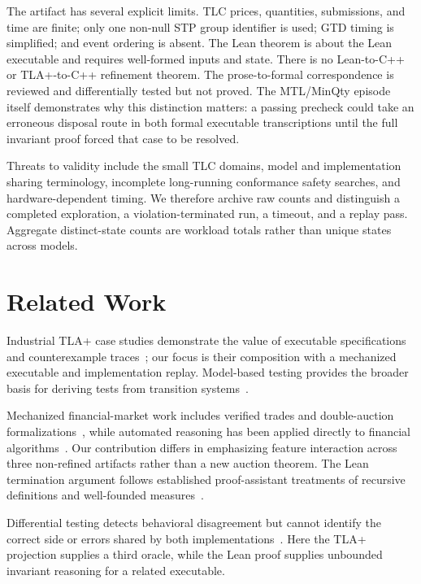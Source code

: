 \documentclass[runningheads]{llncs}
\begin{document}
The artifact has several explicit limits. TLC prices, quantities, submissions,
and time are finite; only one non-null STP group identifier is used; GTD timing
is simplified; and event ordering is absent. The Lean theorem is about the
Lean executable and requires well-formed inputs and state. There is no
Lean-to-C++ or TLA+-to-C++ refinement theorem.
The prose-to-formal correspondence is reviewed and differentially tested but
not proved. The MTL/MinQty episode itself demonstrates why this distinction
matters: a passing precheck could take an erroneous disposal route in both
formal executable transcriptions until the full invariant proof forced that
case to be resolved.

Threats to validity include the small TLC domains, model and implementation
sharing terminology, incomplete long-running conformance safety searches, and
hardware-dependent timing. We therefore archive raw counts and distinguish a
completed exploration, a violation-terminated run, a timeout, and a replay
pass. Aggregate distinct-state counts are workload totals rather than unique
states across models.

\section{Related Work}

Industrial TLA+ case studies demonstrate the value of executable
specifications and counterexample traces~\cite{Newcombe2015,Newcombe2014}; our
focus is their composition with a mechanized executable and implementation
replay. Model-based testing provides the broader basis for deriving tests from
transition systems~\cite{Tretmans2008,Utting2012}.

Mechanized financial-market work includes verified trades and double-auction
formalizations~\cite{Sarswat2020,Natarajan2021,Garg2025}, while automated
reasoning has been applied directly to financial
algorithms~\cite{Passmore2017,Passmore2021}.
Our contribution differs in emphasizing feature interaction across three
non-refined artifacts rather than a new auction theorem. The Lean termination
argument follows established proof-assistant treatments of recursive
definitions and well-founded measures~\cite{Krauss2009,Bove2016}.

Differential testing detects behavioral disagreement but cannot identify the
correct side or errors shared by both implementations~\cite{McKeeman1998}.
Here the TLA+ projection supplies a third oracle, while the Lean proof supplies
unbounded invariant reasoning for a related executable.
\end{document}

